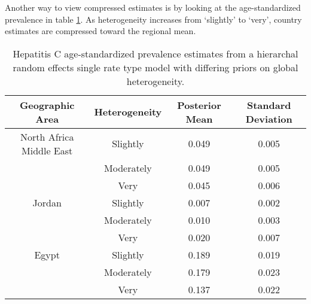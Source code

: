 Another way to view compressed estimates is by looking at the age-standardized prevalence in table \ref{tab:app-hepc global rfx}.  As heterogeneity increases from `slightly' to `very', country estimates are compressed toward the regional mean.

    \begin{table}[h]
        \begin{center}
        \caption{ Hepatitis C age-standardized prevalence estimates from a hierarchal random effects single rate type model with differing priors on global heterogeneity.}
        \label{tab:app-hepc global rfx}
        \begin{tabular}{|c|c|c|c|}
            \hline
                Geographic Area & Heterogeneity & Posterior Mean & Standard Deviation \\
            \hline
                North Africa Middle East & Slightly & 0.049 & 0.005 \\
                & Moderately & 0.049 & 0.005 \\
                & Very & 0.045 & 0.006 \\
            \hline
                Jordan & Slightly & 0.007 & 0.002 \\
                & Moderately & 0.010 & 0.003 \\
                & Very & 0.020 & 0.007 \\
            \hline
                Egypt & Slightly & 0.189 & 0.019 \\
                & Moderately & 0.179 & 0.023 \\
                & Very & 0.137 & 0.022 \\
            \hline
        \end{tabular}
        \end{center}
    \end{table}
